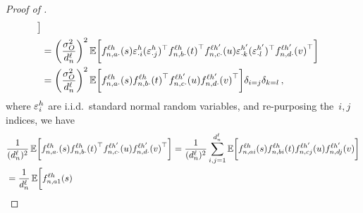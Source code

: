 \begin{proof}[Proof of ]
\begin{align*}
        \bigr]
        \\
        &= 
        \biggl(\frac{\sigma_{O}^2}{d_{n}^{\ell}}\biggr)^2
        \operatorname*{\mathbb{E}} \biggl[
            {f}^{\ell h}_{n, a \cdot}{(s)} \varepsilon_{\cdot i}^{h}
            (\varepsilon_{\cdot j}^{h})^\top {f}^{\ell h}_{n, b \cdot}{(t)}^\top
            {f}^{\ell h'}_{n, c \cdot}{(u)} \varepsilon_{\cdot k}^{h'}
            (\varepsilon_{\cdot l}^{h'})^\top {f}^{\ell h'}_{n, d \cdot}{(v)}^\top
        \biggr]
        \\
        &=
        \biggl(\frac{\sigma_{O}^2}{d_{n}^{\ell}}\biggr)^2
        \operatorname*{\mathbb{E}} \biggl[
            {f}^{\ell h}_{n, a \cdot}{(s)} 
            {f}^{\ell h}_{n, b \cdot}{(t)}^\top
            {f}^{\ell h'}_{n, c \cdot}{(u)} 
            {f}^{\ell h'}_{n, d \cdot}{(v)}^\top
        \biggr]
        \delta_{i = j} \delta_{k = l}
        \, , 
    \end{align*}
    where $\varepsilon_{i}^h$ are i.i.d.\ standard normal random variables,
    and re-purposing the~$i, j$ indices, we have
    \begin{align*}
        &\frac{1}{(\layerDimensionN)^2}
        \E \biggl[
            \indexedActivation{\depthSymbol \headIndex}{\sequenceVariable, a \cdot}{s} 
            \indexedActivation{\depthSymbol \headIndex}{\sequenceVariable, b \cdot}{t}^\top
            \indexedActivation{\depthSymbol \headIndex'}{\sequenceVariable, c \cdot}{u} 
            \indexedActivation{\depthSymbol \headIndex'}{\sequenceVariable, d \cdot}{v}^\top
        \biggr]
        =
        \frac{1}{(\layerDimensionN)^2}
        \sum_{i, j = 1}^{\layerDimensionN}
            \E \biggl[
                \indexedActivation{\depthSymbol \headIndex}{\sequenceVariable, a i}{s} 
                \indexedActivation{\depthSymbol \headIndex}{\sequenceVariable, b i}{t}
                \indexedActivation{\depthSymbol \headIndex'}{\sequenceVariable, c j}{u} 
                \indexedActivation{\depthSymbol \headIndex'}{\sequenceVariable, d j}{v}
            \biggr]
        \\
        &=
        \frac{1}{\layerDimensionN}
        \E \biggl[
            \indexedActivation{\depthSymbol \headIndex}{\sequenceVariable, a 1}{s} 

\end{align*}
\end{proof}
